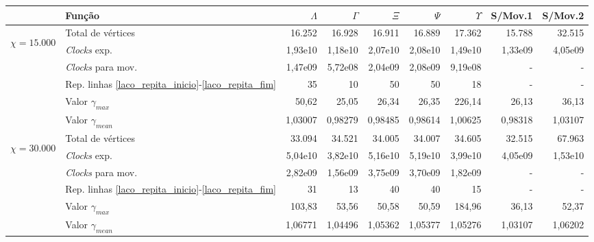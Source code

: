 \begin{table}
\begin{center}
\begin{tabular}{|c|l|r|r|r|r|r|r|r|} %
\hline
& Função & $\Lambda$ & $\Gamma$ & $\Xi$ & $\Psi$ & $\Upsilon$ & S/Mov.1 & S/Mov.2 \\
\hline %
\multirow{5}{*}{\begin{sideways}$\chi = 15.000$\end{sideways} } 
& Total de vértices                                                     & 16.252 & 16.928 & 16.911 & 16.889 & 17.362 & 15.788 & 32.515 \\
& {\it Clocks} exp.	                                             	& 1,93e10 & 1,18e10 & 2,07e10 & 2,08e10 & 1,49e10 & 1,33e09 & 4,05e09\\
& {\it Clocks} para mov.                                      		& 1,47e09 & 5,72e08 & 2,04e09 &  2,08e09& 9,19e08 & - & - \\
& Rep. linhas \ref{laco_repita_inicio}-\ref{laco_repita_fim} 		& 35 & 10 & 50 & 50 & 18 & - & - \\
& Valor $\gamma_{max}$							& 50,62 & 25,05 & 26,34 & 26,35 & 226,14 & 26,13 & 36,13 \\
& Valor $\gamma_{mean}$							& 1,03007 & 0,98279 & 0,98485 & 0,98614 & 1,00625 & 0,98318 & 1,03107 \\
\hline %
\multirow{5}{*}{\begin{sideways}$\chi = 30.000$\end{sideways} } 
& Total de vértices                                                     & 33.094 & 34.521 & 34.005 & 34.007 & 34.605 & 32.515 & 67.963 \\
& {\it Clocks} exp.	                                             	& 5,04e10 & 3,82e10 & 5,16e10 & 5,19e10 & 3,99e10 & 4,05e09 & 1,53e10 \\
& {\it Clocks} para mov.                                      		& 2,82e09 & 1,56e09 & 3,75e09 & 3,70e09 & 1,82e09 & - & - \\
& Rep. linhas \ref{laco_repita_inicio}-\ref{laco_repita_fim} 		& 31 & 13 & 40 & 40 & 15 & - & - \\
& Valor $\gamma_{max}$							& 103,83 & 53,56 & 50,58 & 50,59 & 184,96 & 36,13 & 52,37 \\
& Valor $\gamma_{mean}$							& 1,06771 & 1,04496 & 1,05362 & 1,05377 & 1,05276 & 1,03107 & 1,06202 \\

\end{tabular}
\end{center}
\end{table}
